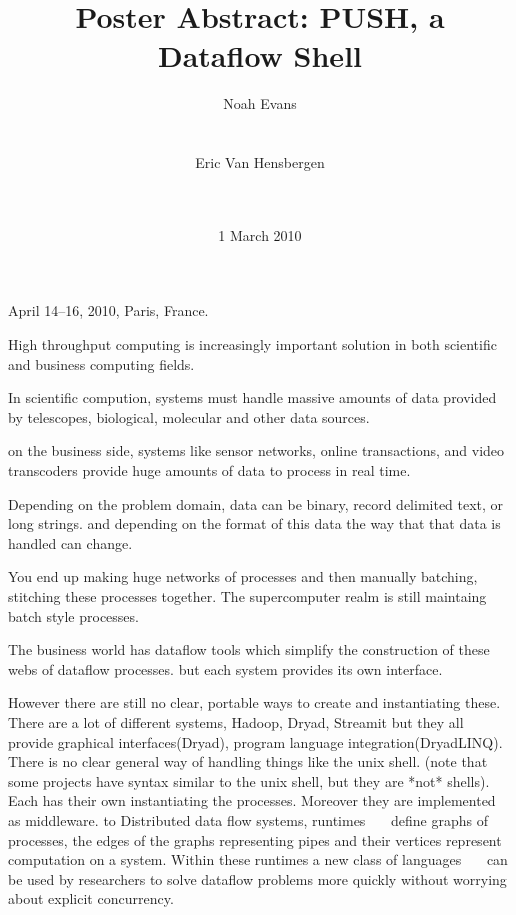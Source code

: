 \documentclass{sig-alt-release2}
\begin{document}
 {April 14--16, 2010, Paris, France.} 
\title{Poster Abstract: PUSH, a Dataflow Shell}

\author{
\alignauthor Noah Evans \\
\\
\\
\alignauthor Eric Van Hensbergen \\
\\
\\
}
\date{1 March 2010}

\maketitle

High throughput computing is increasingly important solution in
both scientific and business computing fields.

In scientific compution, systems must handle massive amounts of
data provided by telescopes, biological, molecular and other data
sources.

on the business side,  systems like sensor networks, online
transactions, and video transcoders provide huge
amounts of data to process in real time.

Depending on the problem domain, data can be binary, record delimited text, or long
strings. and depending on the format of this data the way that that
data is handled can change.

You end up making huge networks of processes and then manually
batching, stitching these processes together. The supercomputer
realm is still maintaing batch style processes.

The business world
has dataflow tools which simplify the construction of these webs
of dataflow processes. but each system provides its own interface.

However there are still no clear, portable ways to create and
instantiating these. There are a lot of different systems, Hadoop,
Dryad, Streamit but they all provide graphical interfaces(Dryad),
program language integration(DryadLINQ). There is no clear general
way of handling things like the unix shell. (note that some projects
have syntax similar to the unix shell, but they are *not* shells).
Each has their own instantiating the processes. Moreover they are
implemented as middleware.
to
Distributed data flow systems,
runtimes~\cite{dean2008msd}~\cite{bialecki:hfr}~\cite{isard2007ddd} define
graphs of processes, the edges of the graphs representing pipes and
their vertices represent computation on a system.  Within these
runtimes a new class of
languages~\cite{pike2005idp}~\cite{yu2008dsg}~\cite{olston2008pln} can
be used by researchers to solve dataflow problems more
quickly without worrying about explicit concurrency.
\end{document}
